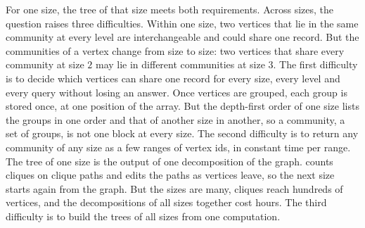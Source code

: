 For one size, the tree of that size meets both requirements.
%
Across sizes, the question raises three difficulties.
%
Within one size, two vertices that lie in the same community at every level are interchangeable and could share one record.
%
But the communities of a vertex change from size to size: two vertices that share every community at size $2$ may lie in different communities at size $3$.
%
The first difficulty is to decide which vertices can share one record for every size, every level and every query without losing an answer.
%
Once vertices are grouped, each group is stored once, at one position of the array.
%
But the depth-first order of one size lists the groups in one order and that of another size in another, so a community, a set of groups, is not one block at every size.
%
The second difficulty is to return any community of any size as a few ranges of vertex ids, in constant time per range.
%
The tree of one size is the output of one decomposition of the graph.
%
\cnd counts cliques on clique paths and edits the paths as vertices leave, so the next size starts again from the graph.
%
But the sizes are many, cliques reach hundreds of vertices, and the decompositions of all sizes together cost hours.
%
The third difficulty is to build the trees of all sizes from one computation.

